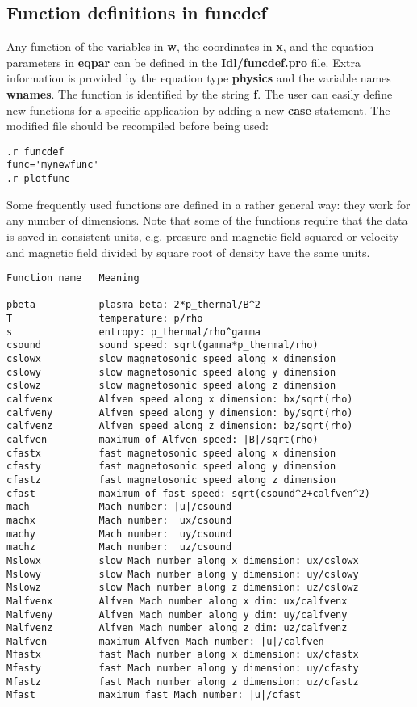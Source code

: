 \subsection{Function definitions in funcdef \label{s-funcdef}}

   Any function of the variables in {\bf w}, the coordinates in
   {\bf x}, and the equation parameters in {\bf eqpar} can be defined in the 
   {\bf Idl/funcdef.pro} file. Extra information is provided by the equation 
   type {\bf physics} and the variable names {\bf wnames}. The function is 
   identified by the string {\bf f}. The user can easily define new functions
   for a specific application by adding a new {\bf case} statement.
   The modified file should be recompiled before being used:
\begin{verbatim}
.r funcdef
func='mynewfunc'
.r plotfunc
\end{verbatim}
   Some frequently used functions are defined in a rather general way:
   they work for any number of dimensions. Note that some of the functions
   require that the data is saved in consistent units, e.g. 
   pressure and magnetic field squared or velocity and magnetic field
   divided by square root of density have the same units.
\begin{verbatim}
Function name   Meaning
------------------------------------------------------------
pbeta           plasma beta: 2*p_thermal/B^2
T               temperature: p/rho
s               entropy: p_thermal/rho^gamma
csound          sound speed: sqrt(gamma*p_thermal/rho)
cslowx          slow magnetosonic speed along x dimension
cslowy          slow magnetosonic speed along y dimension
cslowz          slow magnetosonic speed along z dimension
calfvenx        Alfven speed along x dimension: bx/sqrt(rho)
calfveny        Alfven speed along y dimension: by/sqrt(rho)
calfvenz        Alfven speed along z dimension: bz/sqrt(rho)
calfven         maximum of Alfven speed: |B|/sqrt(rho)
cfastx          fast magnetosonic speed along x dimension
cfasty          fast magnetosonic speed along y dimension
cfastz          fast magnetosonic speed along z dimension
cfast           maximum of fast speed: sqrt(csound^2+calfven^2)
mach            Mach number: |u|/csound
machx           Mach number:  ux/csound
machy           Mach number:  uy/csound
machz           Mach number:  uz/csound
Mslowx          slow Mach number along x dimension: ux/cslowx
Mslowy          slow Mach number along y dimension: uy/cslowy
Mslowz          slow Mach number along z dimension: uz/cslowz
Malfvenx        Alfven Mach number along x dim: ux/calfvenx
Malfveny        Alfven Mach number along y dim: uy/calfveny
Malfvenz        Alfven Mach number along z dim: uz/calfvenz
Malfven         maximum Alfven Mach number: |u|/calfven
Mfastx          fast Mach number along x dimension: ux/cfastx
Mfasty          fast Mach number along y dimension: uy/cfasty
Mfastz          fast Mach number along z dimension: uz/cfastz
Mfast           maximum fast Mach number: |u|/cfast
\end{verbatim}

